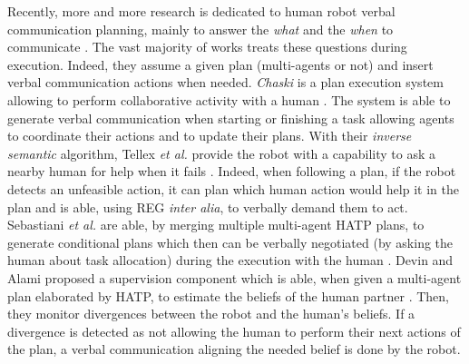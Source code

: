 \documentclass[a4paper,11pt,twoside]{StyleThese}
\begin{document}
Recently, more and more research is dedicated to human robot verbal communication planning, mainly to answer the \textit{what} and the \textit{when} to communicate \cite{mavridis2015review}. The vast majority of works treats these questions during execution. Indeed, they assume a given plan (multi-agents or not) and insert verbal communication actions when needed.
\textit{Chaski} is a plan execution system allowing to perform collaborative activity with a human \cite{shah2011improved}. The system is able to generate verbal communication when starting or finishing a task allowing agents to coordinate their actions and to update their plans.
With their \textit{inverse semantic} algorithm, Tellex \textit{et al.} provide the robot with a capability to ask a nearby human for help when it fails \cite{tellex2014asking}. Indeed, when following a plan, if the robot detects an unfeasible action, it can plan which human action would help it in the plan and is able, using REG \textit{inter alia}, to verbally demand them to act. 
Sebastiani \textit{et al.} are able, by merging multiple multi-agent HATP plans, to generate conditional plans which then can be verbally negotiated (by asking the human about task allocation) during the execution with the human \cite{sebastiani2017dealing}. 
Devin and Alami proposed a supervision component which is able, when given a multi-agent plan elaborated by HATP, to estimate the beliefs of the human partner \cite{devin2016implemented}. Then, they monitor divergences between the robot and the human's beliefs. If a divergence is detected as not allowing the human to perform their next actions of the plan, a verbal communication aligning the needed belief is done by the robot. 
\end{document}
